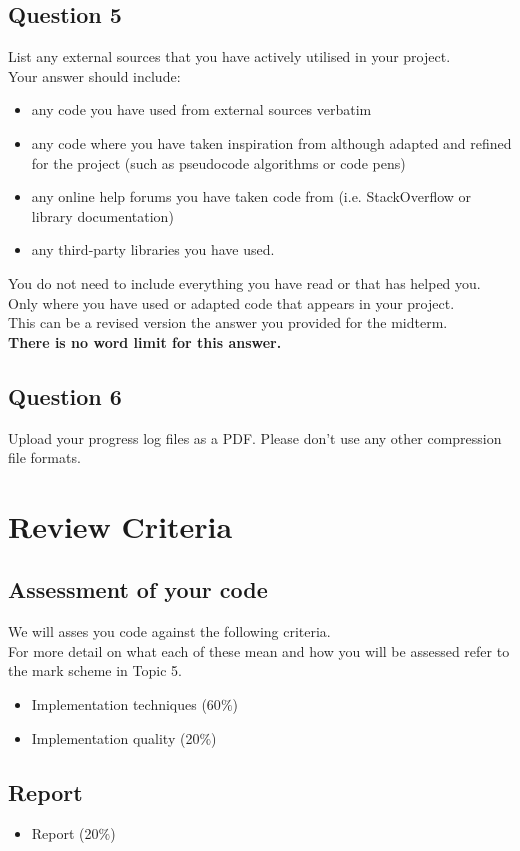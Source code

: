\subsection*{Question 5}
List any external sources that you have actively utilised in your project.\\
Your answer should include:
\begin{itemize}
  \item any code you have used from external sources verbatim
  \item any code where you have taken inspiration from although adapted and refined for the project (such as pseudocode algorithms or code pens)
  \item any online help forums you have taken code from (i.e. StackOverflow or library documentation)
  \item any third-party libraries you have used.
\end{itemize}
You do not need to include everything you have read or that has helped you. Only where you have used or adapted code that appears in your project.\\
This can be a revised version the answer you provided for the midterm.\\
\textbf{There is no word limit for this answer.}

\subsection*{Question 6}
Upload your progress log files as a PDF. Please don’t use any other compression file formats.

\section*{Review Criteria}
\subsection*{Assessment of your code}
We will asses you code against the following criteria.\\
For more detail on what each of these mean and how you will be assessed refer to the mark scheme in Topic 5.
\begin{itemize}
  \item Implementation techniques (60$\%$)
  \item Implementation quality (20$\%$)
\end{itemize}
\subsection*{Report}
\begin{itemize}
  \item Report (20$\%$)
\end{itemize}
